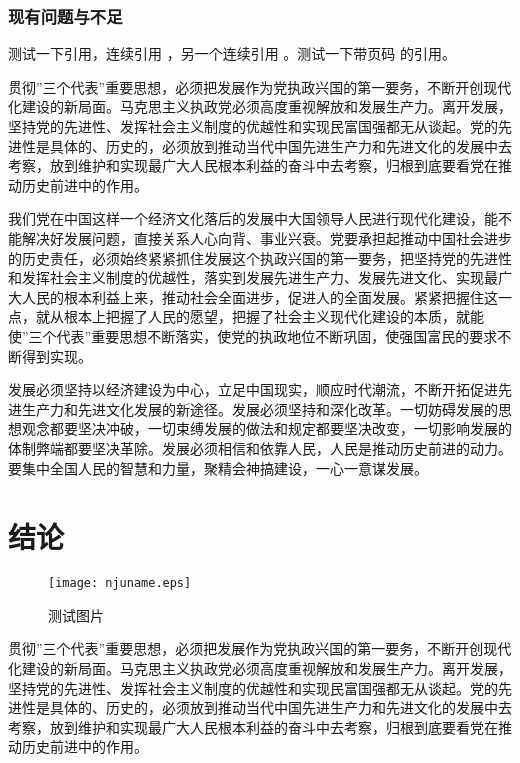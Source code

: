 \documentclass[adobefonts]{njuthesis}
\begin{document}
\subsection{现有问题与不足}

测试一下引用\cite{newman2006structure}，连续引用
\cite{newman2001random,aiello2000random,bollobas2001random}，另一个连续引用
\cite{newman2001random,bollobas2001random,barabasi1999emergence}。测试一下带页码
的引用\cite[124--128]{erdHos1961strength}。

贯彻”三个代表”重要思想，必须把发展作为党执政兴国的第一要务，不断开创现代化建设的新局面。马克思主义执政党必须高度重视解放和发展生产力。离开发展，坚持党的先进性、发挥社会主义制度的优越性和实现民富国强都无从谈起。党的先进性是具体的、历史的，必须放到推动当代中国先进生产力和先进文化的发展中去考察，放到维护和实现最广大人民根本利益的奋斗中去考察，归根到底要看党在推动历史前进中的作用。 

我们党在中国这样一个经济文化落后的发展中大国领导人民进行现代化建设，能不能解决好发展问题，直接关系人心向背、事业兴衰。党要承担起推动中国社会进步的历史责任，必须始终紧紧抓住发展这个执政兴国的第一要务，把坚持党的先进性和发挥社会主义制度的优越性，落实到发展先进生产力、发展先进文化、实现最广大人民的根本利益上来，推动社会全面进步，促进人的全面发展。紧紧把握住这一点，就从根本上把握了人民的愿望，把握了社会主义现代化建设的本质，就能使”三个代表”重要思想不断落实，使党的执政地位不断巩固，使强国富民的要求不断得到实现。 

发展必须坚持以经济建设为中心，立足中国现实，顺应时代潮流，不断开拓促进先进生产力和先进文化发展的新途径。发展必须坚持和深化改革。一切妨碍发展的思想观念都要坚决冲破，一切束缚发展的做法和规定都要坚决改变，一切影响发展的体制弊端都要坚决革除。发展必须相信和依靠人民，人民是推动历史前进的动力。要集中全国人民的智慧和力量，聚精会神搞建设，一心一意谋发展。 

\chapter{结论}

\begin{figure}[htbp]
   \centering
   \texttt{[image: njuname.eps]} %
   \caption{测试图片}
   \label{fig:example}
\end{figure}

贯彻”三个代表”重要思想，必须把发展作为党执政兴国的第一要务，不断开创现代化建设的新局面。马克思主义执政党必须高度重视解放和发展生产力。离开发展，坚持党的先进性、发挥社会主义制度的优越性和实现民富国强都无从谈起。党的先进性是具体的、历史的，必须放到推动当代中国先进生产力和先进文化的发展中去考察，放到维护和实现最广大人民根本利益的奋斗中去考察，归根到底要看党在推动历史前进中的作用。 
\end{document}
